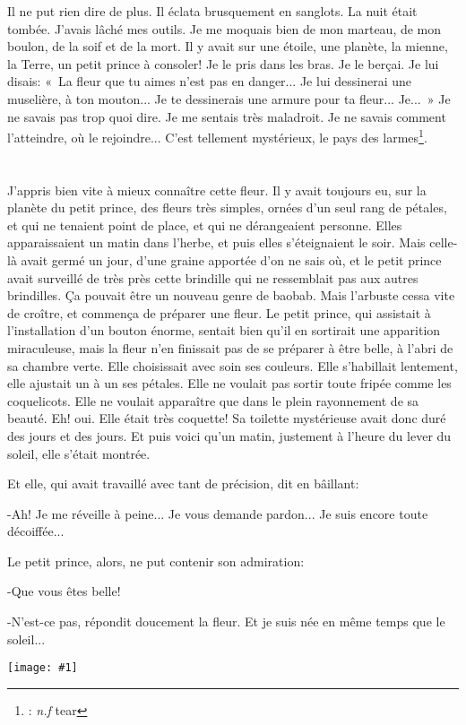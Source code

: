 \documentclass{report}
\newcommand{\pos}[1]{\textit{#1}}
\newcommand{\ft}[3][]{\footnote{%
\if\relax\detokenize{#1}\relax\else#1: \fi%
\if\relax\detokenize{#2}\relax\else\pos{#2} \fi%
#3}}
\newcommand{\parachapter}[2][]{\chapter[#1]{#2}}
\newcommand{\incpic}[1]{%
\begin{center}
    \texttt{[image: \#1]}
\end{center}%
}
\begin{document}
Il ne put rien dire de plus. Il éclata brusquement en sanglots. La nuit était tombée. J'avais lâché mes outils. Je me moquais bien de mon marteau, de mon boulon, de la soif et de la mort. Il y avait sur une étoile, une planète, la mienne, la Terre, un petit prince à consoler! Je le pris dans les bras. Je le berçai. Je lui disais: «~La fleur que tu aimes n'est pas en danger... Je lui dessinerai une muselière, à ton mouton... Je te dessinerais une armure pour ta fleur... Je...~» Je ne savais pas trop quoi dire. Je me sentais très maladroit. Je ne savais comment l'atteindre, où le rejoindre... C'est tellement mystérieux, le pays des larmes\ft[]{n.f}{tear}.

\parachapter[VIII]{} %
J'appris bien vite à mieux connaître cette fleur. Il y avait toujours eu, sur la planète du petit prince, des fleurs très simples, ornées d'un seul rang de pétales, et qui ne tenaient point de place, et qui ne dérangeaient personne. Elles apparaissaient un matin dans l'herbe, et puis elles s'éteignaient le soir. Mais celle-là avait germé un jour, d'une graine apportée d'on ne sais où, et le petit prince avait surveillé de très près cette brindille qui ne ressemblait pas aux autres brindilles. Ça pouvait être un nouveau genre de baobab. Mais l'arbuste cessa vite de croître, et commença de préparer une fleur. Le petit prince, qui assistait à l'installation d'un bouton énorme, sentait bien qu'il en sortirait une apparition miraculeuse, mais la fleur n'en finissait pas de se préparer à être belle, à l'abri de sa chambre verte. Elle choisissait avec soin ses couleurs. Elle s'habillait lentement, elle ajustait un à un ses pétales. Elle ne voulait pas sortir toute fripée comme les coquelicots. Elle ne voulait apparaître que dans le plein rayonnement de sa beauté. Eh! oui. Elle était très coquette! Sa toilette mystérieuse avait donc duré des jours et des jours. Et puis voici qu'un matin, justement à l'heure du lever du soleil, elle s'était montrée.

Et elle, qui avait travaillé avec tant de précision, dit en bâillant:

-Ah! Je me réveille à peine... Je vous demande pardon... Je suis encore toute décoiffée...

Le petit prince, alors, ne put contenir son admiration:

-Que vous êtes belle!

-N'est-ce pas, répondit doucement la fleur. Et je suis née en même temps que le soleil...

\incpic{pic/image18.jpeg}
\end{document}
